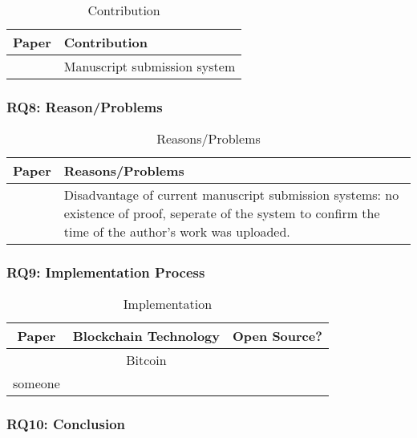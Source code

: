\begin{longtable}{ |c|p{6cm}| }
	\caption{Contribution} \\
	\hline
 	\textbf{Paper} & \textbf{Contribution} \\ [0.5ex] 
 	\hline\hline
 	\endhead
 	\cite{2017_Gipp} & Manuscript submission system\\
	\hline
\end{longtable}

\clearpage
\subsubsection{RQ8: Reason/Problems}

\begin{longtable}{ |c|p{6cm}| }
	\caption{Reasons/Problems}
	\label{tab:rq8_reason_problem}\\
	\hline
 	\textbf{Paper} & \textbf{Reasons/Problems} \\ [0.5ex] 
 	\hline\hline
 	\endhead
 	\cite{2017_Gipp} & Disadvantage of current manuscript submission systems: no existence of proof, seperate of the system to confirm the time of the author's work was uploaded.\\
	\hline
\end{longtable}

\clearpage
\subsubsection{RQ9: Implementation Process}

\begin{longtable}{ |c|c|c| }
	\caption{Implementation}
	\label{tab:rq9_implementation_process}\\
	\hline
 	\textbf{Paper} & Blockchain Technology & \textbf{Open Source?} \\ [0.5ex] 
 	\hline\hline
 	\endhead
 	\cite{2017_Gipp} & Bitcoin & \cmark \\
	\hline
	someone & \xmark \\
	\hline
\end{longtable}

\clearpage
\subsubsection{RQ10: Conclusion}

